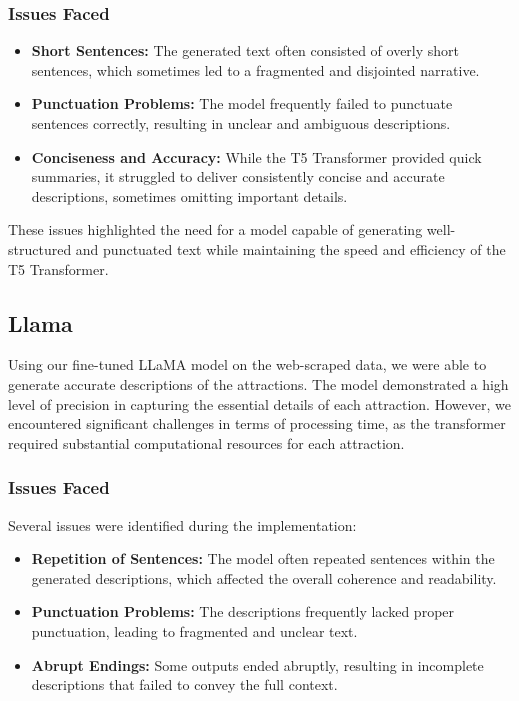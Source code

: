 \documentclass[conference]{IEEEtran}
\begin{document}
        \subsubsection{Issues Faced}
            \begin{itemize}
                \item \textbf{Short Sentences:} The generated text often consisted of overly short sentences, which sometimes led to a fragmented and disjointed narrative.
                \item \textbf{Punctuation Problems:} The model frequently failed to punctuate sentences correctly, resulting in unclear and ambiguous descriptions.
                \item \textbf{Conciseness and Accuracy:} While the T5 Transformer provided quick summaries, it struggled to deliver consistently concise and accurate descriptions, sometimes omitting important details.
            \end{itemize}

            These issues highlighted the need for a model capable of generating well-structured and punctuated text while maintaining the speed and efficiency of the T5 Transformer.

    \subsection{Llama}

        Using our fine-tuned LLaMA model on the web-scraped data, we were able to generate accurate descriptions of the attractions. The model demonstrated a high level of precision in capturing the essential details of each attraction. However, we encountered significant challenges in terms of processing time, as the transformer required substantial computational resources for each attraction.

        \subsubsection{Issues Faced}
            Several issues were identified during the implementation:
            \begin{itemize}
                \item \textbf{Repetition of Sentences:} The model often repeated sentences within the generated descriptions, which affected the overall coherence and readability.
                \item \textbf{Punctuation Problems:} The descriptions frequently lacked proper punctuation, leading to fragmented and unclear text.
                \item \textbf{Abrupt Endings:} Some outputs ended abruptly, resulting in incomplete descriptions that failed to convey the full context.
            \end{itemize}
\end{document}
